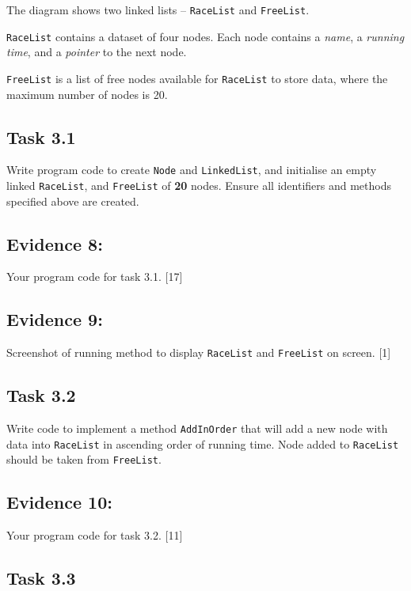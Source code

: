 \documentclass{article}
\begin{document}
The diagram shows two linked lists -- \texttt{RaceList} and \texttt{FreeList}.

\texttt{RaceList} contains a dataset of four nodes. Each node contains
a \emph{name}, a \emph{running time}, and a \emph{pointer} to the
next node. 

\texttt{FreeList} is a list of free nodes available for \texttt{RaceList}
to store data, where the maximum number of nodes is 20.

\subsection*{Task 3.1 }

Write program code to create \texttt{Node} and \texttt{LinkedList},
and initialise an empty linked \texttt{RaceList}, and \texttt{FreeList}
of \textbf{20} nodes. Ensure all identifiers and methods specified
above are created. 

\subsection*{Evidence 8: }

Your program code for task 3.1. \hfill{}{[}17{]}

\subsection*{Evidence 9: }

Screenshot of running method to display \texttt{RaceList} and \texttt{FreeList}
on screen. \hfill{}{[}1{]}

\subsection*{Task 3.2 }

Write code to implement a method \texttt{AddInOrder} that will add
a new node with data into \texttt{RaceList} in ascending order of
running time. Node added to \texttt{RaceList} should be taken from
\texttt{FreeList}. 

\subsection*{Evidence 10: }

Your program code for task 3.2. \hfill{}{[}11{]}

\subsection*{Task 3.3 }
\end{document}
